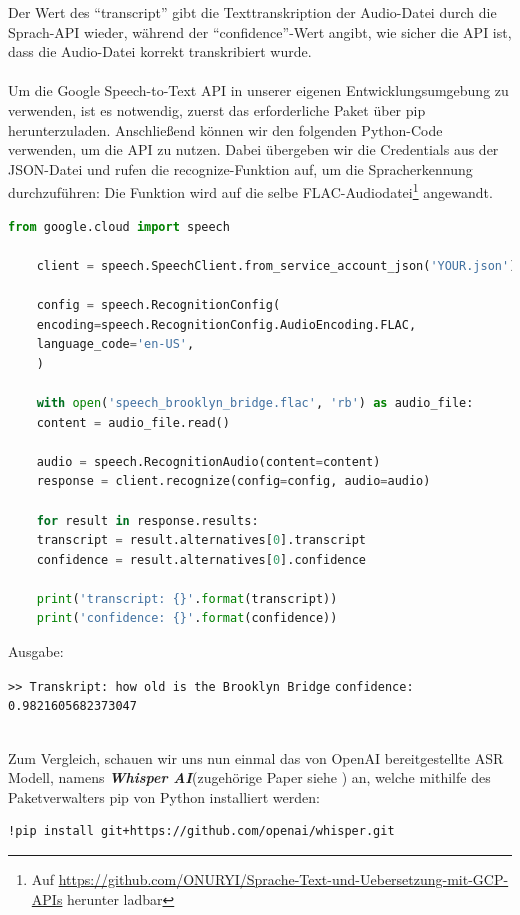\documentclass[12pt,a4paper]{article}
\begin{document}
\setlength\parindent{0pt}
Der Wert des \enquote{transcript} gibt die Texttranskription der Audio-Datei durch die Sprach-API wieder, während der \enquote{confidence}-Wert angibt, wie sicher die API ist, dass die Audio-Datei korrekt transkribiert wurde. 
\\ \\ 
Um die Google Speech-to-Text API in unserer eigenen Entwicklungsumgebung zu verwenden, ist es notwendig, zuerst das erforderliche Paket über pip herunterzuladen. Anschließend können wir den folgenden Python-Code verwenden, um die API zu nutzen. Dabei übergeben wir die Credentials aus der JSON-Datei und rufen die recognize-Funktion auf, um die Spracherkennung durchzuführen:
Die Funktion wird auf die selbe FLAC-Audiodatei\footnote{Auf   \url{https://github.com/ONURYI/Sprache-Text-und-Uebersetzung-mit-GCP-APIs} herunter ladbar} angewandt.
\
\begin{lstlisting}[language=Python,numbers = none]
	from google.cloud import speech
	
	client = speech.SpeechClient.from_service_account_json('YOUR.json')
	
	config = speech.RecognitionConfig(
	encoding=speech.RecognitionConfig.AudioEncoding.FLAC,
	language_code='en-US',   
	)
	
	with open('speech_brooklyn_bridge.flac', 'rb') as audio_file:
	content = audio_file.read()
	
	audio = speech.RecognitionAudio(content=content)
	response = client.recognize(config=config, audio=audio)
	
	for result in response.results:
	transcript = result.alternatives[0].transcript
	confidence = result.alternatives[0].confidence
	
	print('transcript: {}'.format(transcript))
	print('confidence: {}'.format(confidence))
\end{lstlisting}
Ausgabe: 
\begin{center}
	\verb|>> Transkript: how old is the Brooklyn Bridge| 
	\verb|confidence: 0.9821605682373047|
\textit{}\end{center}
\  \\ 
Zum Vergleich, schauen wir uns nun einmal das von OpenAI bereitgestellte ASR Modell, namens \textbf{\textit{Whisper AI}}(zugehörige Paper siehe \cite{radford2022robust}) an, welche mithilfe des Paketverwalters pip von Python installiert werden:

\begin{verbatim}
!pip install git+https://github.com/openai/whisper.git 
\end{verbatim}
\end{document}
